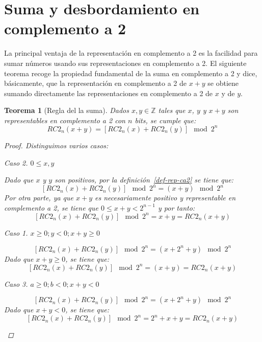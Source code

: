 \documentclass[spanish,a4paper,12pt,titlepage]{article}
\newtheorem{theorem}{Teorema}%
\theoremstyle{definition}
\theoremstyle{remark}
\newtheorem{case}{Caso}
\newcommand{\bbZ}{\mathbb{Z}}
\begin{document}
\section{Suma y desbordamiento en complemento a 2}

La principal ventaja de la representación en complemento a 2 es la facilidad para sumar números usando sus representaciones en complemento a 2. El siguiente teorema recoge la propiedad fundamental de la suma en complemento a 2 y dice, básicamente, que la representación en complemento a 2 de $x+y$ se obtiene sumando directamente las representaciones en complemento a 2 de $x$ y de $y$.

\begin{theorem}[Regla del la suma]\label{theorem-sum-law}
    Dados $x, y \in \bbZ$ tales que $x$, $y$ y $x+y$ son representables en complemento a 2 con $n$ bits, se cumple que:
    \[
        RC2_n(x+y) = [RC2_n(x) + RC2_n(y)] \mod 2^n
    \]
    \begin{proof}
        Distinguimos varios casos:

        \begin{case}
            $0 \le x,y$

            Dado que $x$ y $y$ son positivos, por la definición~\ref{def-rep-ca2} se tiene que:
            \[
                [RC2_n(x)+RC2_n(y)] \mod 2^n = (x + y) \mod 2^n
            \]
            Por otra parte, ya que $x+y$ es necesariamente positivo y representable en complemento a 2, se tiene que $0 \le x + y < 2^{n-1}$ y por tanto:
            \[
                [RC2_n(x)+RC2_n(y)] \mod 2^n = x + y = RC2_n(x+y)
            \]

            \begin{case}
                $x \ge 0; y < 0; x+y \ge 0$
            \end{case}

            \[
                [RC2_n(x)+RC2_n(y)] \mod 2^n = (x + 2^n + y) \mod 2^n
            \]
            Dado que $x+y \ge 0$, se tiene que:
            \[
                [RC2_n(x)+RC2_n(y)] \mod 2^n = (x + y) = RC2_n(x+y)
            \]
        \end{case}
        \begin{case}
            $a \ge 0; b < 0; x+y < 0$

            \[
                [RC2_n(x)+RC2_n(y)] \mod 2^n = (x + 2^n + y) \mod 2^n
            \]
            Dado que $x+y < 0$, se tiene que:
            \[
                [RC2_n(x)+RC2_n(y)] \mod 2^n = 2^n + x + y = RC2_n(x + y)
            \]
        \end{case}


\end{proof}
\end{theorem}
\end{document}

